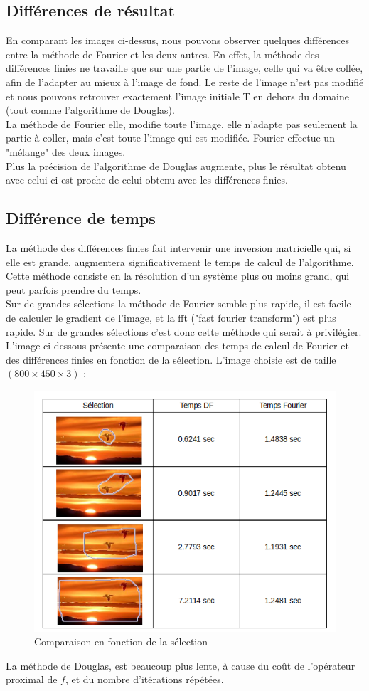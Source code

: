 
\subsection{Différences de résultat}
En comparant les images ci-dessus, nous pouvons observer quelques différences entre la méthode de Fourier et les deux autres. En effet, la méthode des différences finies ne travaille que sur une partie de l'image, celle qui va être collée, afin de l'adapter au mieux à l'image de fond. Le reste de l'image n'est pas modifié et nous pouvons retrouver exactement l'image initiale T en dehors du domaine (tout comme l'algorithme de Douglas). \\
La méthode de Fourier elle, modifie toute l'image, elle n'adapte pas seulement la partie à coller, mais c'est toute l'image qui est modifiée. Fourier effectue un "mélange" des deux images. \\
Plus la précision de l'algorithme de Douglas augmente, plus le résultat obtenu avec celui-ci est proche de celui obtenu avec les différences finies.
\subsection{Différence de temps}
La méthode des différences finies fait intervenir une inversion matricielle qui, si elle est grande, augmentera significativement le temps de calcul de l'algorithme. Cette méthode consiste en la résolution d'un système plus ou moins grand, qui peut parfois prendre du temps. \\
Sur de grandes sélections la méthode de Fourier semble plus rapide, il est facile de calculer le gradient de l'image, et la fft ("fast fourier transform") est plus rapide. Sur de grandes sélections c'est donc cette méthode qui serait à privilégier.\\
L'image ci-dessous présente une comparaison des temps de calcul de Fourier et des différences finies en fonction de la sélection. L'image choisie est de taille $(800 \times 450 \times 3)$ :
\begin{figure}[H]
\centering
\includegraphics[scale=0.4]{Images/comparaisonFD.png}
\caption{Comparaison en fonction de la sélection}
\end{figure}
La méthode de Douglas, est beaucoup plus lente, à cause du coût de l'opérateur proximal de $f$, et du nombre d'itérations répétées.  
